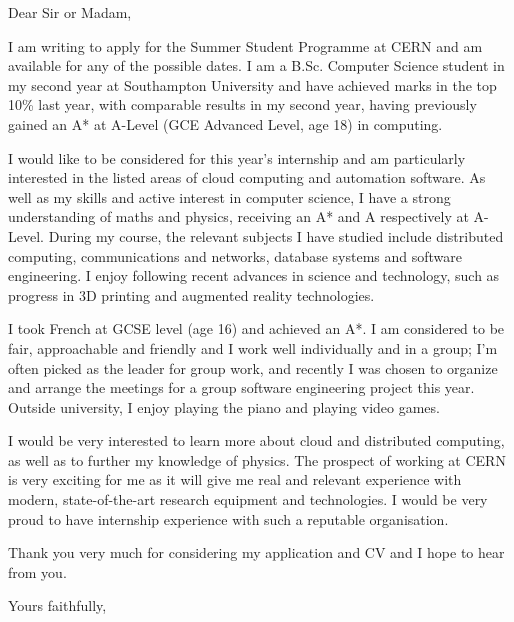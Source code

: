 \documentclass[a4paper, margin=0.3in]{letter}
\begin{document}
\begin{letter}{}

\opening{Dear Sir or Madam,}

I am writing to apply for the Summer Student Programme at CERN and am available for any of the possible dates. I am a B.Sc. Computer Science student in my second year at Southampton University and have achieved marks in the top 10\% last year, with comparable results in my second year, having previously gained an A* at A-Level (GCE Advanced Level, age 18) in computing.

I would like to be considered for this year's internship and am particularly interested in the listed areas of cloud computing and automation software. As well as my skills and active interest in computer science, I have a strong understanding of maths and physics, receiving an A* and A respectively at A-Level. During my course, the relevant subjects I have studied include distributed computing, communications and networks, database systems and software engineering. I enjoy following recent advances in science and technology, such as progress in 3D printing and augmented reality technologies. 

I took French at GCSE level (age 16) and achieved an A*. I am considered to be fair, approachable and friendly and I work well individually and in a group; I'm often picked as the leader for group work, and recently I was chosen to organize and arrange the meetings for a group software engineering project this year. Outside university, I enjoy playing the piano and playing video games.

I would be very interested to learn more about cloud and distributed computing, as well as to further my knowledge of physics. The prospect of working at CERN is very exciting for me as it will give me real and relevant experience with modern, state-of-the-art research equipment and technologies. I would be very proud to have internship experience with such a reputable organisation.

Thank you very much for considering my application and CV and I hope to hear from you.

\closing{Yours faithfully,}

\end{letter}
\end{document}
